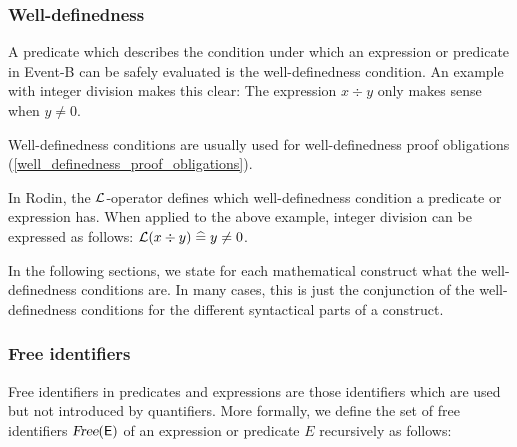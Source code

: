 \subsubsection{Well-definedness}
\label{well_definedness}

A predicate which describes the condition under which an expression or predicate in Event-B can be safely evaluated is the well-definedness condition.
An example with integer division makes this clear: The expression $x\div y$ only makes sense when $y\neq 0$.

Well-definedness conditions are usually used for well-definedness proof obligations (\ref{well_definedness_proof_obligations}).

In Rodin, the $\mathcal{L}$-operator defines which well-definedness condition a predicate or expression has.
When applied to the above example, integer division can be expressed as follows: $\mathcal{L}(x\div y) \mathrel{\widehat=} y\neq 0$.

In the following sections, we state for each mathematical construct what the well-definedness conditions are.
In many cases, this is just the conjunction of the well-definedness conditions for the different syntactical parts of a construct.


\subsubsection{Free identifiers}
\label{free_identifiers}
Free identifiers in predicates and expressions are those identifiers which are used but not introduced by quantifiers.
More formally, we define the set of free identifiers $\textsl{Free}(\textsf{E})$ of an expression or predicate $E$ recursively as follows:

